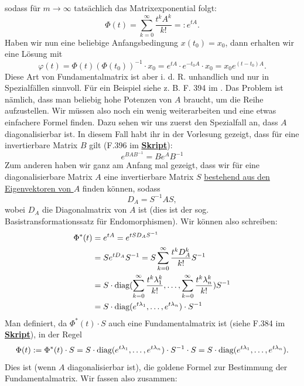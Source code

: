 sodass für $m\rightarrow\infty$ tatsächlich das Matrixexponential folgt:
\begin{equation*}
    \Phi(t)=\sum_{k=0}^\infty \frac{t^k A^k}{k!} =: e^{tA}.
\end{equation*}
Haben wir nun eine beliebige Anfangsbedingung $x(t_0)=x_0$, dann erhalten wir eine Lösung mit
\begin{equation*}
    \varphi(t)=\Phi(t)(\Phi(t_0))^{-1}\cdot x_0=e^{tA}\cdot e^{-t_0 A}\cdot x_0 = x_0 e^{(t-t_0)A}.
\end{equation*}
Diese Art von Fundamentalmatrix ist aber i. d. R. unhandlich und nur in Spezialfällen sinnvoll. Für ein Beispiel siehe z. B. F. 394 im \Skript{}. Das Problem ist nämlich, dass man beliebig hohe Potenzen von $A$ braucht, um die Reihe aufzustellen. Wir müssen also noch ein wenig weiterarbeiten und eine etwas einfachere Formel finden. Dazu sehen wir uns zuerst den Spezialfall an, dass $A$ diagonalisierbar ist. In diesem Fall habt ihr in der Vorlesung gezeigt, dass für eine invertierbare Matrix $B$ gilt (F.396 im \underline{\textbf{Skript}}):
\begin{equation*}
    e^{BAB^{-1}}=Be^{A}B^{-1}
\end{equation*}
Zum anderen haben wir ganz am Anfang mal gezeigt, dass wir für eine diagonalisierbare Matrix $A$ eine invertierbare Matrix $S$ \underline{bestehend aus den Eigenvektoren von $A$} finden können, sodass
\begin{equation*}
    D_A=S^{-1}AS,
\end{equation*}
wobei $D_A$ die Diagonalmatrix von $A$ ist (dies ist der sog. Basistransformationssatz für Endomorphismen). Wir können also schreiben:
\begin{align*}
    \Phi^*(t)&=e^{tA}=e^{tSD_A S^{-1}}\\
    &=Se^{tD_A}S^{-1}=S\sum_{k=0}^\infty\frac{t^k D_A^k}{k!}S^{-1} \\ &= S\cdot \text{diag}(\sum_{k=0}^\infty\frac{t^k\lambda_1^k}{k!},\ldots,\sum_{k=0}^\infty\frac{t^k\lambda_n^k}{k!})S^{-1}\\
    &=S\cdot \text{diag}(e^{t\lambda_1},\ldots,e^{t\lambda_n})\cdot S^{-1}
\end{align*}
Man definiert, da $\Phi^*(t)\cdot S$ auch eine Fundamentalmatrix ist (siehe F.384 im \underline{\textbf{Skript}}), in der Regel
\begin{equation*}
    \Phi(t):=\Phi^*(t)\cdot S = S\cdot \text{diag}(e^{t\lambda_1},\ldots,e^{t\lambda_n})\cdot S^{-1}\cdot S= S\cdot \text{diag}(e^{t\lambda_1},\ldots,e^{t\lambda_n}).
\end{equation*}
Dies ist (wenn $A$ diagonalisierbar ist), die goldene Formel zur Bestimmung der Fundamentalmatrix. Wir fassen also zusammen:

